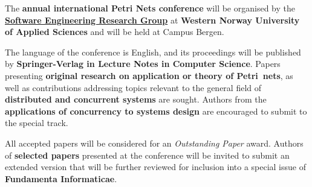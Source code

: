 \documentclass[10pt]{article}
\begin{document}
\noindent
The {\bf{} annual international Petri Nets conference} will be organised by the {\bf \href{https://www.hvl.no/en/research/group/software-engineering/}{Software Engineering Research Group}} at {\bf Western Norway University of Applied Sciences} and will be held at Campus Bergen.

%
\smallskip
\noindent
The language of the conference is English, and its proceedings will be published by
{\bf Springer-Verlag in Lecture Notes in Computer Science}.
Papers presenting {\bf original research on application or theory of Petri nets}, as well
as contributions addressing topics relevant to the general field of {\bf distributed and
concurrent systems} are sought. Authors from the {\bf applications of concurrency
to systems
design} are encouraged to submit to the special track.

\smallskip
\noindent
All accepted papers will be considered for an \textit{Outstanding
Paper} award. Authors of {\bf selected papers} presented at the conference will be invited
to submit an extended version that will be further reviewed for inclusion into a special
issue of {\bf Fundamenta Informaticae}.
\end{document}
